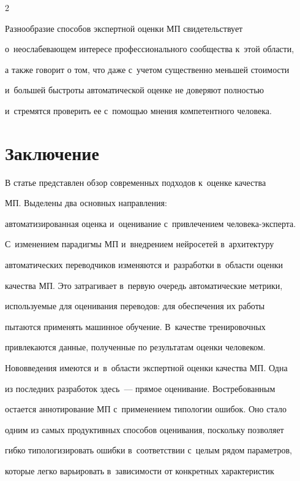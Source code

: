 \begin{multicols}{2}
  


  Разнообразие способов экспертной оценки МП свидетельствует 


о~неослабевающем интересе профессионального сообщества к~этой области, 


а также говорит о том, что даже с~учетом существенно меньшей стоимости 


и~большей быстроты автоматической оценке не доверяют полностью 


и~стремятся проверить ее с~помощью мнения компетентного человека.


  


  \section{Заключение}


  


  В статье представлен обзор современных подходов к~оценке качества 


МП. Выделены два основных направления: 


автоматизированная оценка и~оценивание с~привлечением че\-ло\-ве\-ка-экс\-пер\-та. 


С~изменением парадигмы МП и~внед\-ре\-ни\-ем нейросетей в~архитектуру 


автоматических переводчиков изменяются и~разработки в~области оценки 


качества МП. Это затрагивает в~первую очередь автоматические метрики, 


используемые для оценивания переводов: для обеспечения их работы 


пытаются применять машинное обучение. В~качестве тренировочных 


привлекаются данные, полученные по результатам оценки человеком. 


Нововведения имеются и~в~об\-ласти экспертной оценки качества МП. Одна 


из последних разработок здесь~--- прямое оценивание. Востребованным 


остается аннотирование МП с~применением типологии ошибок. Оно стало 


одним из самых продуктивных способов оценивания, поскольку позволяет 


гибко типологизировать ошибки в~соответствии с~целым рядом параметров, 


которые легко варьировать в~зависимости от конкретных характеристик 



\end{multicols}
